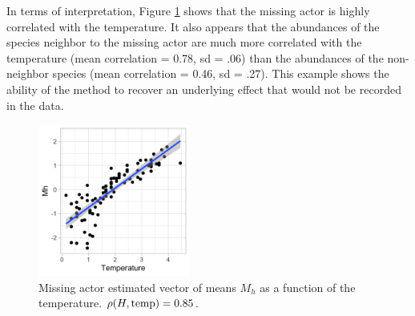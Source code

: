 
In terms of interpretation, Figure \ref{fig:barents_temp} shows that the missing actor is highly correlated with the temperature. It also appears that the abundances of the species neighbor to the missing actor are much more correlated with the temperature (mean correlation = 0.78, sd = .06) than the abundances of the non-neighbor species (mean correlation = 0.46, sd = .27). This example shows the ability of the method to recover an underlying effect that would not be recorded in the data.

\begin{figure}
    \centering
    \includegraphics[width=5cm]{figs/Barents_MH_temp_white.png}
    \caption{Missing actor estimated vector of means $M_h$ as a function of the temperature. ${\rho(H, \text{temp})}=0.85$.}
    \label{fig:barents_temp}
\end{figure}



